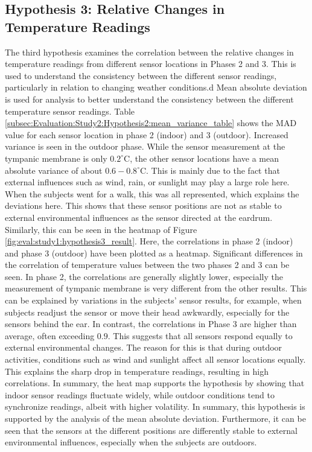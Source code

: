 \subsection{Hypothesis 3: Relative Changes in Temperature Readings}
\label{subsec:Evaluation:Study1:Hypothesis3}
The third hypothesis examines the correlation between the relative changes in temperature readings from different sensor locations in Phases 2 and 3.
This is used to understand the consistency between the different sensor readings, particularly in relation to changing weather conditions.d
Mean absolute deviation is used for analysis to better understand the consistency between the different temperature sensor readings. 
Table \ref{subsec:Evaluation:Study2:Hypothesis2:mean_variance_table} shows the MAD value for each sensor location in phase 2 (indoor) and 3 (outdoor). 
Increased variance is seen in the outdoor phase. 
While the sensor measurement at the tympanic membrane is only $0.2 ^\circ\text{C}$, the other sensor locations have a mean absolute variance of about $0.6-0.8^\circ\text{C}$.
This is mainly due to the fact that external influences such as wind, rain, or sunlight may play a large role here.
When the subjects went for a walk, this was all represented, which explains the deviations here. 
This shows that these sensor positions are not as stable to external environmental influences as the sensor directed at the eardrum.
Similarly, this can be seen in the heatmap of Figure \ref{fig:eval:study1:hypothesis3_result}. 
Here, the correlations in phase 2 (indoor) and phase 3 (outdoor) have been plotted as a heatmap. 
Significant differences in the correlation of temperature values between the two phases 2 and 3 can be seen. 
In phase 2, the correlations are generally slightly lower, especially the measurement of tympanic membrane is very different from the other results.
This can be explained by variations in the subjects' sensor results, for example, when subjects readjust the sensor or move their head awkwardly, especially for the sensors behind the ear. 
In contrast, the correlations in Phase 3 are higher than average, often exceeding $0.9$. 
This suggests that all sensors respond equally to external environmental changes.
The reason for this is that during outdoor activities, conditions such as wind and sunlight affect all sensor locations equally.
This explains the sharp drop in temperature readings, resulting in high correlations.
In summary, the heat map supports the hypothesis by showing that indoor sensor readings fluctuate widely, while outdoor conditions tend to synchronize readings, albeit with higher volatility.
In summary, this hypothesis is supported by the analysis of the mean absolute deviation. 
Furthermore, it can be seen that the sensors at the different positions are differently stable to external environmental influences, especially when the subjects are outdoors.

